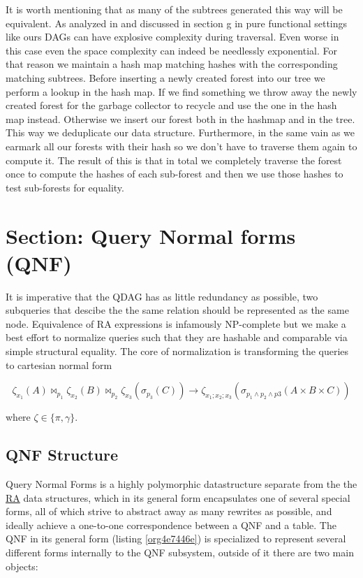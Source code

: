 It is worth mentioning that as many of the subtrees generated this way
will be equivalent. As analyzed in
\cite{selsamSealingPointerbasedOptimizations2020} and discussed in
section g in pure functional settings like ours DAGs can
have explosive complexity during traversal. Even worse in this case
even the space complexity can indeed be needlessly exponential. For
that reason we maintain a hash map matching hashes with the
corresponding matching subtrees. Before inserting a newly created
forest into our tree we perform a lookup in the hash map. If we find
something we throw away the newly created forest for the garbage
collector to recycle and use the one in the hash map
instead. Otherwise we insert our forest both in the hashmap and in the
tree. This way we deduplicate our data structure. Furthermore, in the
same vain as \cite{selsamSealingPointerbasedOptimizations2020} we
earmark all our forests with their hash so we don't have to traverse
them again to compute it. The result of this is that in total we
completely traverse the forest once to compute the hashes of each
sub-forest and then we use those hashes to test sub-forests for
equality.

\section{Section: Query Normal forms (QNF)}
\label{sec:org9e7f455}
It is imperative that the QDAG has as little redundancy as possible,
two subqueries that descibe the the same relation should be
represented as the same node. Equivalence of RA expressions is
infamously NP-complete
\cite{sagivEquivalencesRelationalExpressions1980} but we make a best
effort to normalize queries such that they are hashable and comparable
via simple structural equality. The core of normalization is
transforming the queries to cartesian normal form

\[
  \zeta_{x_1}(A) \Join_{p_1} \zeta_{x_2}(B) \Join_{p_2} \zeta_{x_3} (\sigma_{p_3}(C)) \to \zeta_{x_1;x_2;x_3}(\sigma_{p_1 \land p_2 \land p3}(A \times B \times C))
\]

where \(\zeta \in \{\pi,\gamma\}\).


\subsection{QNF Structure}
\label{sec:org1912b6b}
Query Normal Forms is a highly polymorphic datastructure separate from
the the \hyperref[sec:relational_algebra_semantics]{RA} data structures, which in its general form encapsulates one
of several special forms, all of which strive to abstract away as many
rewrites as possible, and ideally achieve a one-to-one correspondence
between a QNF and a table. The QNF in its general form (listing
\ref{org4e7446e}) is specialized to represent several different forms
internally to the QNF subsystem, outside of it there are two main
objects:

